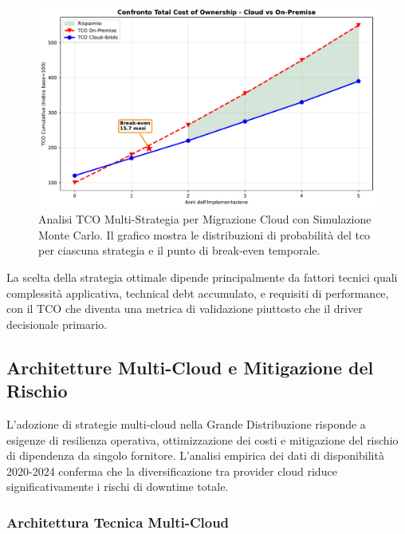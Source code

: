 \begin{figure}[htbp]
\centering
\includegraphics[width=\textwidth]{thesis_figures/cap3/fig_3_4_tco_comparison.pdf}
\caption{Analisi TCO Multi-Strategia per Migrazione Cloud con Simulazione Monte Carlo. Il grafico mostra le distribuzioni di probabilità del \gls{tco} per ciascuna strategia e il punto di break-even temporale.}
\label{fig:cloud_tco}
\end{figure}

La scelta della strategia ottimale dipende principalmente da fattori tecnici quali complessità applicativa, technical debt accumulato, e requisiti di performance, con il TCO che diventa una metrica di validazione piuttosto che il driver decisionale primario.%


\subsection{\texorpdfstring{Architetture Multi-Cloud e Mitigazione del Rischio}{3.4.2 - Architetture Multi-Cloud e Mitigazione del Rischio}}

L'adozione di strategie multi-cloud nella Grande Distribuzione risponde a esigenze di resilienza operativa, ottimizzazione dei costi e mitigazione del rischio di dipendenza da singolo fornitore. L'analisi empirica dei dati di disponibilità 2020-2024\autocite{Uptime2024} conferma che la diversificazione tra provider cloud riduce significativamente i rischi di downtime totale.

\subsubsection{\texorpdfstring{Architettura Tecnica Multi-Cloud}{3.4.2.1 - Architettura Tecnica Multi-Cloud}}

